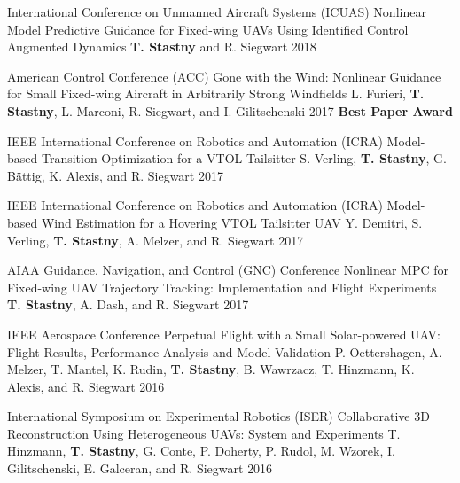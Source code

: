 \begin{cventries}
\cvpubentry
	{International Conference on Unmanned Aircraft Systems (ICUAS)} %
	{Nonlinear Model Predictive Guidance for Fixed-wing UAVs Using Identified Control Augmented Dynamics} %
	{\textbf{T. Stastny} and R. Siegwart} %
	{} %
	{2018} %
	{} %
	{} %

\cvpubentry
	{American Control Conference (ACC)} %
	{Gone with the Wind: Nonlinear Guidance for Small Fixed-wing Aircraft in Arbitrarily Strong Windfields} %
	{L. Furieri, \textbf{T. Stastny}, L. Marconi, R. Siegwart, and I. Gilitschenski} %
	{} %
	{2017} %
	{} %
	{\textbf{Best Paper Award}} %
	
\cvpubentry
	{IEEE International Conference on Robotics and Automation (ICRA)} %
	{Model-based Transition Optimization for a VTOL Tailsitter} %
	{S. Verling, \textbf{T. Stastny}, G. B{\"a}ttig, K. Alexis, and R. Siegwart} %
	{} %
	{2017} %
	{} %
	{} %
	
\cvpubentry
	{IEEE International Conference on Robotics and Automation (ICRA)} %
	{Model-based Wind Estimation for a Hovering VTOL Tailsitter UAV} %
	{Y. Demitri, S. Verling, \textbf{T. Stastny}, A. Melzer, and R. Siegwart} %
	{} %
	{2017} %
	{} %
	{} %
		
\cvpubentry
	{AIAA Guidance, Navigation, and Control (GNC) Conference} %
	{Nonlinear MPC for Fixed-wing UAV Trajectory Tracking: Implementation and Flight Experiments} %
	{\textbf{T. Stastny}, A. Dash, and R. Siegwart} %
	{} %
	{2017} %
	{} %
	{} %

\cvpubentry
	{IEEE Aerospace Conference} %
	{Perpetual Flight with a Small Solar-powered UAV: Flight Results, Performance Analysis and Model Validation} %
	{P. Oettershagen, A. Melzer, T. Mantel, K. Rudin, \textbf{T. Stastny}, B. Wawrzacz, T. Hinzmann, K. Alexis, and R. Siegwart} %
	{} %
	{2016} %
	{} %
	{} %


\cvpubentry
	{International Symposium on Experimental Robotics (ISER)} %
	{Collaborative 3D Reconstruction Using Heterogeneous UAVs: System and Experiments} %
	{T. Hinzmann, \textbf{T. Stastny}, G. Conte, P. Doherty, P. Rudol, M. Wzorek, I. Gilitschenski, E. Galceran, and R. Siegwart} %
	{} %
	{2016} %
	{} %
	{} %


\end{cventries}
